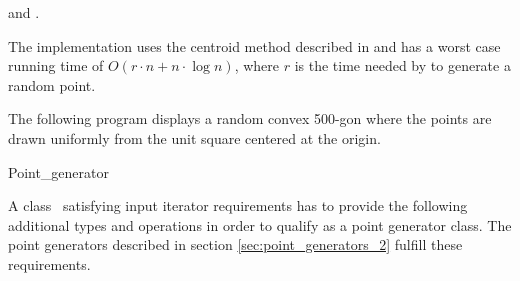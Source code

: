 
\ccSeeAlso {} and
.

\ccImplementation The implementation uses the centroid method
described in \cite{s-zkm-96} and has a worst case running time of $O(r
\cdot n + n \cdot \log n)$, where $r$ is the time needed by 
to generate a random point.

\ccExample

The following program displays a random convex 500-gon where the
points are drawn uniformly from the unit square centered at the
origin.


\ccTagDefaults

\begin{ccClass}{Point_generator}
     \ccTagFullDeclarations
    
    \label{point_generator_req}
    \ccModifierCrossRefOff
    \ccModifierCrossRefOn
    
    \ccDefinition A class \ccClassName\ satisfying input iterator
    requirements has to provide the following additional types and
    operations in order to qualify as a point generator class. The
    point generators described in section \ref{sec:point_generators_2}
    fulfill these requirements.

    \ccTypes\ccIndexClassTypes
    
    

    \ccOperations
    \begin{ccIndexMemberFunctions}
    
    \end{ccIndexMemberFunctions}
    
\end{ccClass}

